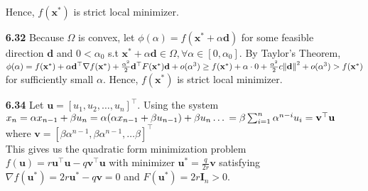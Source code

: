 \documentclass[10pt]{article}
\begin{document}
\begin{enumerate}
        Hence, $f(\mathbf{x}^*)$ is strict local minimizer.
        \item [\textbf{6.32}] Because $\Omega$ is convex, let $\phi(\alpha)=f(\mathbf{x}^*+\alpha\mathbf{d})$ for some feasible direction $\mathbf{d}$ and $0<\alpha_0$ s.t $\mathbf{x}^*+\alpha\mathbf{d}\in\Omega,\forall\alpha\in[0,\alpha_0]$.
        By Taylor's Theorem, $\phi(\alpha)=f(\mathbf{x}^*)+\alpha\mathbf{d}^\top\nabla f(\mathbf{x}^*)+\frac{\alpha^2}{2}\mathbf{d}^\top F(\mathbf{x}^*)\mathbf{d}+o(\alpha^3)\\
        \ge f(\mathbf{x}^*)+\alpha\cdot 0+\frac{\alpha^2}{2}c{\lVert\mathbf{d}\rVert}^2 +o(\alpha^3)>f(\mathbf{x}^*)$ for sufficiently small $\alpha$.
        Hence, $f(\mathbf{x}^*)$ is strict local minimizer.
        \item [\textbf{6.34}] Let $\mathbf{u}={[u_1,u_2,\ldots, u_n]}^\top$. Using the system\\
        $x_n=\alpha x_{n-1}+\beta u_n\\
        =\alpha(\alpha x_{n-1}+\beta u_{n-1})+\beta u_n\\
        \ldots\\
        =\beta \sum_{i=1}^{n}\alpha^{n-i}u_i=\mathbf{v}^\top \mathbf{u}$ where $\mathbf{v}={[\beta\alpha^{n-1},\beta\alpha^{n-1},\ldots \beta ]}^\top$\\
        This gives us the quadratic form minimization problem $f(\mathbf{u})=r\mathbf{u}^\top\mathbf{u}-q\mathbf{v}^\top \mathbf{u}$ with minimizer $\mathbf{u}^*=\frac{q}{2r}\mathbf{v}$ satisfying $\nabla f(\mathbf{u}^*)=2r\mathbf{u}^*-q\mathbf{v}=0$ and $F(\mathbf{u}^*)=2r\mathbf{I}_n>0$.
\end{enumerate}
\end{document}
